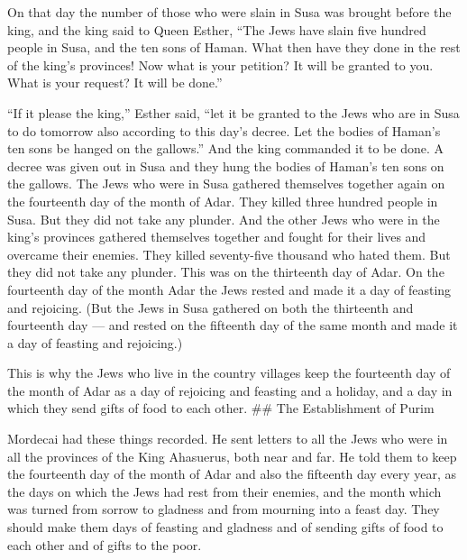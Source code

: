  On that day the number of those who were slain in Susa was
brought before the king,  and the king said to Queen
Esther, ``The Jews have slain five hundred people in Susa, and the ten
sons of Haman. What then have they done in the rest of the king's
provinces! Now what is your petition? It will be granted to you. What is
your request? It will be done.''

 ``If it please the king,'' Esther said, ``let it be
granted to the Jews who are in Susa to do tomorrow also according to
this day's decree. Let the bodies of Haman's ten sons be hanged on the
gallows.''  And the king commanded it to be done. A decree
was given out in Susa and they hung the bodies of Haman's ten sons on
the gallows.  The Jews who were in Susa gathered themselves
together again on the fourteenth day of the month of Adar. They killed
three hundred people in Susa. But they did not take any plunder.
 And the other Jews who were in the king's provinces
gathered themselves together and fought for their lives and overcame
their enemies. They killed seventy-five thousand who hated them. But
they did not take any plunder.  This was on the thirteenth
day of Adar. On the fourteenth day of the month Adar the Jews rested and
made it a day of feasting and rejoicing.  (But the Jews in
Susa gathered on both the thirteenth and fourteenth day --- and rested
on the fifteenth day of the same month and made it a day of feasting and
rejoicing.)

 This is why the Jews who live in the country villages keep
the fourteenth day of the month of Adar as a day of rejoicing and
feasting and a holiday, and a day in which they send gifts of food to
each other. \#\# The Establishment of Purim

 Mordecai had these things recorded. He sent letters to all
the Jews who were in all the provinces of the King Ahasuerus, both near
and far.  He told them to keep the fourteenth day of the
month of Adar and also the fifteenth day every year,  as
the days on which the Jews had rest from their enemies, and the month
which was turned from sorrow to gladness and from mourning into a feast
day. They should make them days of feasting and gladness and of sending
gifts of food to each other and of gifts to the poor.

